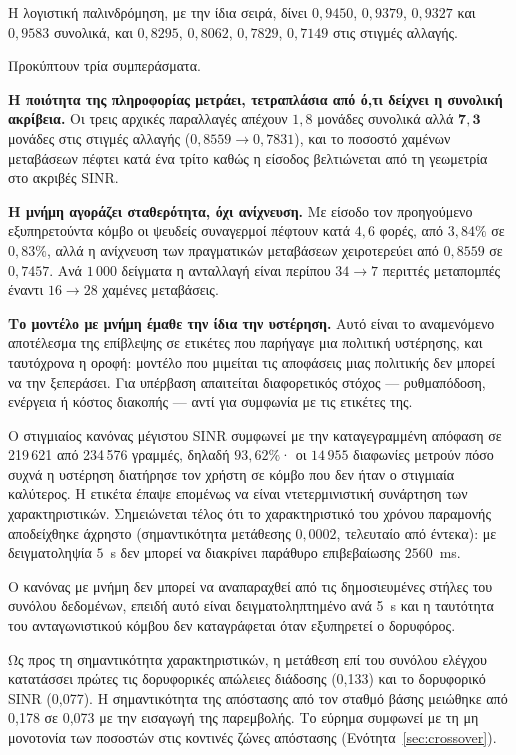 \documentclass[11pt,a4paper]{article}
\begin{document}
Η λογιστική παλινδρόμηση, με την ίδια σειρά, δίνει $0{,}9450$, $0{,}9379$,
$0{,}9327$ και $0{,}9583$ συνολικά, και $0{,}8295$, $0{,}8062$, $0{,}7829$,
$0{,}7149$ στις στιγμές αλλαγής.

Προκύπτουν τρία συμπεράσματα.

\textbf{Η ποιότητα της πληροφορίας μετράει, τετραπλάσια από ό,τι δείχνει η
συνολική ακρίβεια.} Οι τρεις αρχικές παραλλαγές απέχουν $1{,}8$ μονάδες
συνολικά αλλά $\mathbf{7{,}3}$ μονάδες στις στιγμές αλλαγής
($0{,}8559 \rightarrow 0{,}7831$), και το ποσοστό χαμένων μεταβάσεων πέφτει
κατά ένα τρίτο καθώς η είσοδος βελτιώνεται από τη γεωμετρία στο ακριβές SINR.

\textbf{Η μνήμη αγοράζει σταθερότητα, όχι ανίχνευση.} Με είσοδο τον
προηγούμενο εξυπηρετούντα κόμβο οι ψευδείς συναγερμοί πέφτουν κατά $4{,}6$
φορές, από $3{,}84\%$ σε $0{,}83\%$, αλλά η ανίχνευση των πραγματικών
μεταβάσεων χειροτερεύει από $0{,}8559$ σε $0{,}7457$. Ανά $1\,000$ δείγματα η
ανταλλαγή είναι περίπου $34 \rightarrow 7$ περιττές μεταπομπές έναντι
$16 \rightarrow 28$ χαμένες μεταβάσεις.

\textbf{Το μοντέλο με μνήμη έμαθε την ίδια την υστέρηση.} Αυτό είναι το
αναμενόμενο αποτέλεσμα της επίβλεψης σε ετικέτες που παρήγαγε μια πολιτική
υστέρησης, και ταυτόχρονα η οροφή: μοντέλο που μιμείται τις αποφάσεις μιας
πολιτικής δεν μπορεί να την ξεπεράσει. Για υπέρβαση απαιτείται διαφορετικός
στόχος — ρυθμαπόδοση, ενέργεια ή κόστος διακοπής — αντί για συμφωνία με τις
ετικέτες της.

Ο στιγμιαίος κανόνας μέγιστου SINR συμφωνεί με την καταγεγραμμένη απόφαση σε
219\,621 από 234\,576 γραμμές, δηλαδή $93{,}62\%$· οι $14\,955$ διαφωνίες
μετρούν πόσο συχνά η υστέρηση διατήρησε τον χρήστη σε κόμβο που δεν ήταν ο
στιγμιαία καλύτερος. Η ετικέτα έπαψε επομένως να είναι ντετερμινιστική
συνάρτηση των χαρακτηριστικών. Σημειώνεται τέλος ότι το χαρακτηριστικό του
χρόνου παραμονής αποδείχθηκε άχρηστο (σημαντικότητα μετάθεσης $0{,}0002$,
τελευταίο από έντεκα): με δειγματοληψία $5$~s δεν μπορεί να διακρίνει παράθυρο
επιβεβαίωσης $2560$~ms.

Ο κανόνας με μνήμη δεν μπορεί να αναπαραχθεί από τις δημοσιευμένες στήλες του
συνόλου δεδομένων, επειδή αυτό είναι δειγματοληπτημένο ανά 5~s και η ταυτότητα
του ανταγωνιστικού κόμβου δεν καταγράφεται όταν εξυπηρετεί ο δορυφόρος.

Ως προς τη σημαντικότητα χαρακτηριστικών, η μετάθεση επί του συνόλου ελέγχου
κατατάσσει πρώτες τις δορυφορικές απώλειες διάδοσης (0,133) και το δορυφορικό
SINR (0,077). Η σημαντικότητα της απόστασης από τον σταθμό βάσης μειώθηκε από
0,178 σε 0,073 με την εισαγωγή της παρεμβολής. Το εύρημα συμφωνεί με τη μη
μονοτονία των ποσοστών στις κοντινές ζώνες απόστασης
(Ενότητα~\ref{sec:crossover}).
\end{document}
